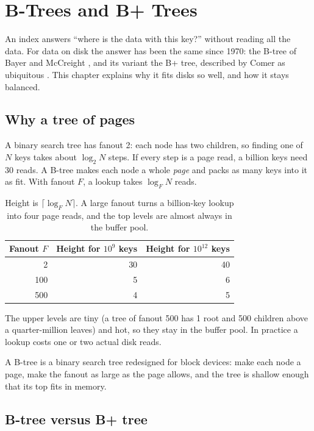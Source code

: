 \chapter{B-Trees and B+ Trees}
\label{ch:btree}

An index answers ``where is the data with this key?'' without reading all the
data. For data on disk the answer has been the same since 1970: the B-tree of
Bayer and McCreight \cite{bayer1972}, and its variant the B+ tree, described by
Comer as ubiquitous \cite{comer1979}. This chapter explains why it fits disks so
well, and how it stays balanced.

\section{Why a tree of pages}

A binary search tree has fanout 2: each node has two children, so finding one
of $N$ keys takes about $\log_2 N$ steps. If every step is a page read, a
billion keys need 30 reads. A B-tree makes each node a whole \emph{page} and
packs as many keys into it as fit. With fanout $F$, a lookup takes
$\log_F N$ reads.

\begin{table}[ht]
\centering
\begin{tabular}{@{}rrr@{}}
\toprule
Fanout $F$ & Height for $10^9$ keys & Height for $10^{12}$ keys \\
\midrule
2 & 30 & 40 \\
100 & 5 & 6 \\
500 & 4 & 5 \\
\bottomrule
\end{tabular}
\caption{Height is $\lceil\log_F N\rceil$. A large fanout turns a billion-key lookup into four page reads, and the top levels are almost always in the buffer pool.}
\end{table}

The upper levels are tiny (a tree of fanout 500 has 1 root and 500 children
above a quarter-million leaves) and hot, so they stay in the buffer pool. In
practice a lookup costs one or two actual disk reads.

\begin{keyidea}
A B-tree is a binary search tree redesigned for block devices: make each node a
page, make the fanout as large as the page allows, and the tree is shallow
enough that its top fits in memory.
\end{keyidea}

\section{B-tree versus B+ tree}

